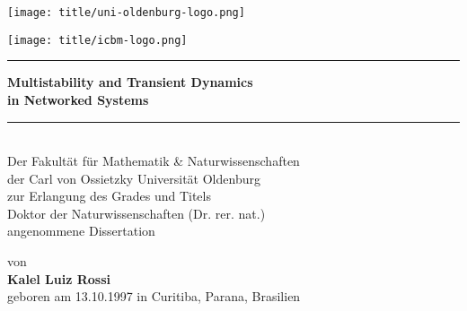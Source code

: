 \begin{titlepage}
    \centering
    \begin{minipage}{0.4\textwidth}
        \centering
        \texttt{[image: title/uni-oldenburg-logo.png]}  %
    \end{minipage}
    \hfill
    \begin{minipage}{0.4\textwidth}
        \centering
        \texttt{[image: title/icbm-logo.png]}  %
    \end{minipage}
    
    \vspace*{2.0cm}
    {
        \noindent\rule{\textwidth}{0.4mm}  %
    \vspace{0.4cm}
    \huge \textbf{Multistability and Transient Dynamics \\[0.25cm] in Networked Systems}
    \vspace{0.4cm}
    \noindent\rule{\textwidth}{0.4mm}  %
    }
    \\[2.2cm]  %
    
    
    \vspace*{2.8cm}  %
    {\large Der Fakultät für Mathematik \& Naturwissenschaften \\[0.25cm]
    der Carl von Ossietzky Universität Oldenburg \\[0.25cm]
    zur Erlangung des Grades und Titels \\[0.25cm]
    Doktor der Naturwissenschaften (Dr. rer. nat.) \\[0.25cm]
    angenommene Dissertation}
    
	\vfill
    {\large von \\[0.28cm]
    \textbf{Kalel Luiz Rossi} \\[0.28cm]
    geboren am 13.10.1997 in Curitiba, Parana, Brasilien}
    
    
\end{titlepage}

